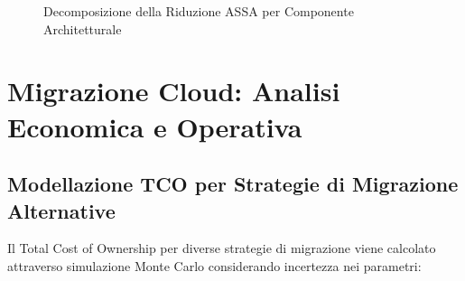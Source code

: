 \begin{figure}[H]
\centering
{}
\caption{Decomposizione della Riduzione ASSA per Componente Architetturale}
\end{figure}

\section{Migrazione Cloud: Analisi Economica e Operativa}

\subsection{Modellazione TCO per Strategie di Migrazione Alternative}

Il Total Cost of Ownership per diverse strategie di migrazione viene calcolato attraverso simulazione Monte Carlo considerando incertezza nei parametri:


